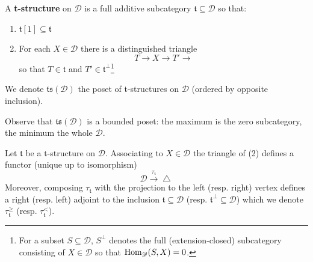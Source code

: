 \begin{defn}
A \textbf{t-structure} on $\mathscr{D}$ is a full additive subcategory $\mathfrak{t} \subseteq \mathscr{D}$ so that: 
\begin{enumerate}
\item $\mathfrak{t}[1] \subseteq \mathfrak{t}$
\item For each $X \in \mathscr{D}$ there is a distinguished triangle $$T \longrightarrow X \longrightarrow T' \longrightarrow $$ so that $T \in \mathfrak{t}$ and $T' \in \mathfrak{t}^{\perp}$\footnote{For a subset $S \subseteq \mathscr{D}$, $S^{\perp}$ denotes the full (extension-closed) subcategory consisting of $X \in \mathscr{D}$ so that $\textnormal{Hom}_{\mathscr{D}}(S,X)=0$.}
\end{enumerate} 
We denote $\mathfrak{ts}(\mathscr{D})$ the poset of t-structures on $\mathscr{D}$ (ordered by opposite inclusion). 
\end{defn}

Observe that $\mathfrak{ts}(\mathscr{D})$ is a bounded poset: the maximum is the zero subcategory, the minimum the whole $\mathscr{D}$. \\

\begin{prop}
Let $\mathfrak{t}$ be a t-structure on $\mathscr{D}$. Associating to $X \in \mathscr{D}$ the triangle of (2) defines a functor (unique up to isomorphism) $$\mathscr{D} \overset{\tau_{\mathfrak{t}}}{\longrightarrow} \bigtriangleup$$ Moreover, composing $\tau_{\mathfrak{t}}$ with the projection to the left (resp. right) vertex defines a right (resp. left) adjoint to the inclusion $\mathfrak{t} \subseteq \mathscr{D}$ (resp. $\mathfrak{t}^{\perp} \subseteq \mathscr{D}$) which we denote $\tau^{\ge}_{\mathfrak{t}}$ (resp. $\tau^{<}_{\mathfrak{t}}$). 
\end{prop}

